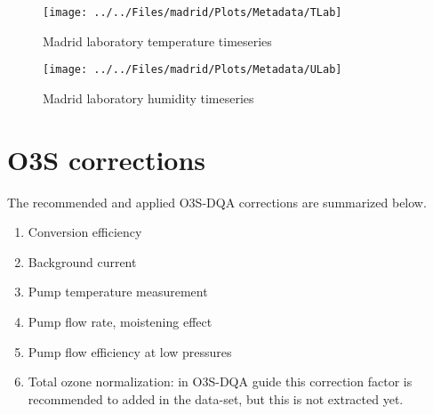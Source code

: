            \begin{figure}
        \centering
\texttt{[image: ../../Files/madrid/Plots/Metadata/TLab]}
    \caption{Madrid laboratory temperature timeseries}
            \label{fig:TLab}
    \end{figure}

               \begin{figure}
        \centering
\texttt{[image: ../../Files/madrid/Plots/Metadata/ULab]}
    \caption{Madrid laboratory humidity timeseries}
            \label{fig:ULab}
    \end{figure}


\section{O3S corrections}
\label{sec:v04}


The recommended and applied O3S-DQA corrections are summarized below.
    \begin{enumerate}
        \item Conversion efficiency
        \item Background current
        \item Pump temperature measurement
        \item Pump flow rate, moistening effect
        \item Pump flow efficiency at low pressures
        \item Total ozone normalization: in O3S-DQA guide this correction factor is recommended to added in the data-set,
        but this is not extracted yet.
\end{enumerate}


